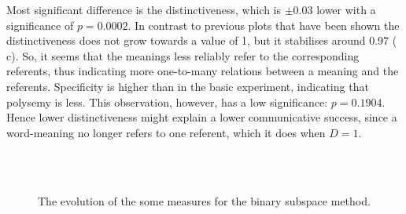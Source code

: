 \begin{description}
Most significant difference is the distinctiveness, which is $\pm 0.03$ lower with a significance of $p=0.0002$. In contrast to previous plots that have been shown the distinctiveness does not grow towards a value of 1, but it stabilises around 0.97 ( c). So, it seems that the meanings less reliably refer to the corresponding referents, thus indicating more one-to-many relations between a meaning and the referents. Specificity is higher than in the basic experiment, indicating that polysemy is less. This observation, however, has a low significance: $p=0.1904$. Hence lower distinctiveness might explain a lower communicative success, since a word-meaning no longer refers to one referent, which it does when $D=1$.
\end{description}

\begin{figure}
\centering
{}
\\
\\
\caption{The evolution of the some measures for the binary subspace method.}
\label{f:cat:bin}
\end{figure}

